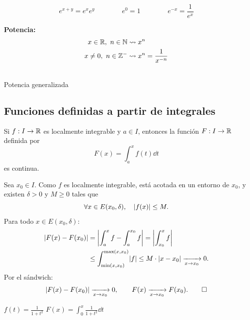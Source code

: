 \documentclass[11pt,a4paper]{article}
\begin{document}
\begin{proposicion}
\[
  e^{x+y}=e^xe^y\qquad\qquad e^0=1\qquad\qquad e^{-x}=\frac{1}{e^x}
\]
\end{proposicion}

\textbf{Potencia:}
\begin{align*}
  x\in\R,\ n\in\N &\leadsto x^n\\
  x\neq0,\ n\in\Z^- &\leadsto x^n=\frac{1}{x^{-n}}
\end{align*}
\begin{center}
\\[0.2em]
Potencia generalizada
\end{center}

\subsection{Funciones definidas a partir de integrales}

\begin{proposicion}
Si $f:I\to\R$ es localmente integrable y $a\in I$, entonces la función $F:I\to\R$ definida por
\[
  F(x)=\int_a^x f(t)\dd t
\]
es continua.
\end{proposicion}

\begin{demo}
Sea $x_0\in I$. Como $f$ es localmente integrable, está acotada en un entorno de $x_0$, y existen $\delta>0$ y $M\geq0$ tales que
\[
  \forall x\in E(x_0,\delta),\quad \abs{f(x)}\leq M.
\]
Para todo $x\in E(x_0,\delta)$:
\begin{align*}
  \abs{F(x)-F(x_0)} &= \abs*{\int_a^x f-\int_a^{x_0} f} = \abs*{\int_{x_0}^x f}\\
  &\leq \int_{\min(x,x_0)}^{\max(x,x_0)}\abs{f} \leq M\cdot\abs{x-x_0}\xrightarrow[x\to x_0]{}0.
\end{align*}
Por el sándwich:
\[
  \abs{F(x)-F(x_0)}\xrightarrow[x\to x_0]{}0,\qquad F(x)\xrightarrow[x\to x_0]{}F(x_0). \qedhere
\]
\end{demo}

\begin{center}
\qquad
$\displaystyle f(t)=\frac{1}{1+t^2}$
\qquad
$\displaystyle F(x)=\int_0^x\frac{1}{1+t^2}\dd t$
\end{center}
\end{document}

